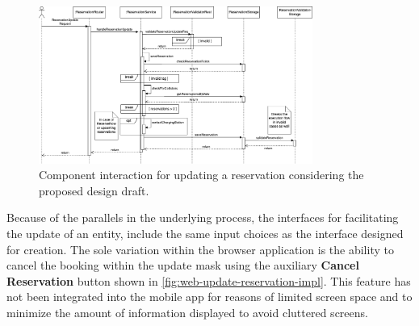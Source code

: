 \newpage

\begin{figure}[h]
    \centering
    \includegraphics[width=0.8\textwidth,keepaspectratio]{resources/images/main/6_implementation/processes/ReservationUpdate.png}
    \caption{Component interaction for updating a reservation considering the proposed design draft.}
    \label{fig:update-reservation-seqflow}
\end{figure}

\noindent Because of the parallels in the underlying process, the interfaces for facilitating the update of an entity, include the same input choices as the interface designed for creation.
The sole variation within the browser application is the ability to cancel the booking within the update mask using the auxiliary \textbf{Cancel Reservation} button shown in \ref{fig:web-update-reservation-impl}. 
This feature has not been integrated into the mobile app for reasons of limited screen space and to minimize the amount of information displayed to avoid cluttered screens.

